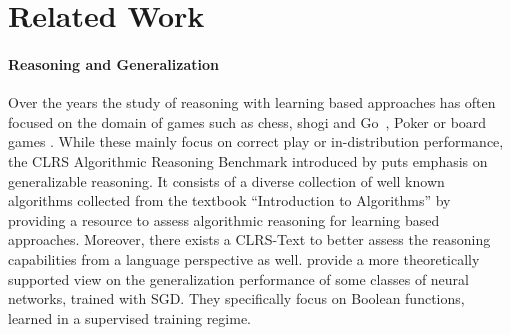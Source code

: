 \section{Related Work}
\paragraph{Reasoning and Generalization}
    Over the years the study of reasoning with learning based approaches has often focused on the domain of games such as chess, shogi and Go~\citep{lai2015giraffe,silver2016alphago,silver2017mastering, silver2018general}, Poker \citep{dahl2001reinforcement,heinrich2016deep,steinberger2019pokerrl, zhao2022alphaholdem} or board games \citep{ghory2004reinforcement, szita2012reinforcement, xenou2019deep, perolat2022mastering}.
    While these mainly focus on correct play or in-distribution performance, the CLRS Algorithmic Reasoning Benchmark introduced by \citet{Velickovic2022} puts emphasis on generalizable reasoning. It consists of a diverse collection of well known algorithms collected from the textbook ``Introduction to Algorithms'' by~\citet{cormen2022clrs} providing a resource to assess algorithmic reasoning for learning based approaches. Moreover, there exists a CLRS-Text \cite{markeeva2024clrstextalgorithmicreasoninglanguage} to better assess the reasoning capabilities from a language perspective as well. 
    \citet{abbe2024generalization} provide a more theoretically supported view on the generalization performance of some classes of neural networks, trained with SGD.
    They specifically focus on Boolean functions, learned in a supervised training regime.
    

